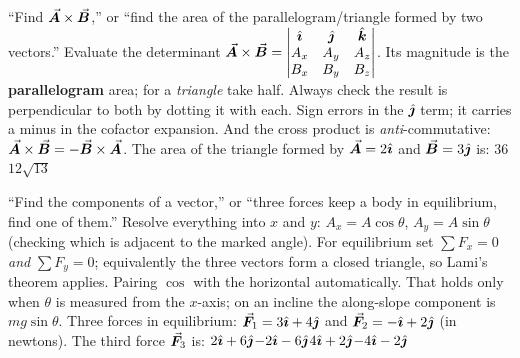 {``Find $\vec{\bm{A}}\times\vec{\bm{B}}$,'' or ``find the area of the parallelogram/triangle formed by two vectors.''}
{Evaluate the determinant
$\vec{\bm{A}}\times\vec{\bm{B}}=\begin{vmatrix}\hat{\bm{\imath}}&\hat{\bm{\jmath}}&\hat{\bm{k}}\\ A_x&A_y&A_z\\ B_x&B_y&B_z\end{vmatrix}$.
Its magnitude is the \textbf{parallelogram} area; for a \emph{triangle} take half. Always check the
result is perpendicular to both by dotting it with each.}
{Sign errors in the $\hat{\bm{\jmath}}$ term; it carries a minus in the cofactor expansion. And the cross product
is \emph{anti}-commutative: $\vec{\bm{A}}\times\vec{\bm{B}}=-\vec{\bm{B}}\times\vec{\bm{A}}$.}
{The area of the triangle formed by $\vec{\bm{A}}=2\hat{\bm{\imath}}$ and $\vec{\bm{B}}=3\hat{\bm{\jmath}}$ is:}
{$3$}{$6$}{$12$}{$\sqrt{13}$}

{``Find the components of a vector,'' or ``three forces keep a body in equilibrium, find one of
them.''}
{Resolve everything into $x$ and $y$: $A_x=A\cos\theta$, $A_y=A\sin\theta$ (checking which is adjacent to
the marked angle). For equilibrium set $\sum F_x=0$ \emph{and} $\sum F_y=0$; equivalently the three
vectors form a closed triangle, so Lami's theorem applies.}
{Pairing $\cos$ with the horizontal automatically. That holds only when $\theta$ is measured from the
$x$-axis; on an incline the along-slope component is $mg\sin\theta$.}
{Three forces in equilibrium: $\vec{\bm{F}}_1=3\hat{\bm{\imath}}+4\hat{\bm{\jmath}}$ and $\vec{\bm{F}}_2=-\hat{\bm{\imath}}+2\hat{\bm{\jmath}}$ (in newtons). The
third force $\vec{\bm{F}}_3$ is:}
{$2\hat{\bm{\imath}}+6\hat{\bm{\jmath}}$}{$-2\hat{\bm{\imath}}-6\hat{\bm{\jmath}}$}{$4\hat{\bm{\imath}}+2\hat{\bm{\jmath}}$}{$-4\hat{\bm{\imath}}-2\hat{\bm{\jmath}}$}

